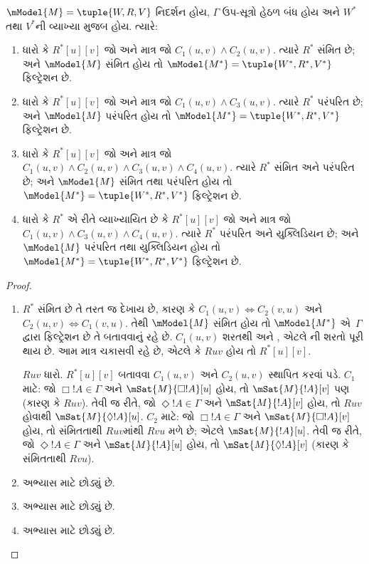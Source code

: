 \begin{thm}
  $\mModel{M} =\tuple{W,R,V}$ નિદર્શન હોય, $\Gamma$ ઉપ-સૂત્રો
  હેઠળ બંધ હોય અને $W^*$ તથા $V^*$ની વ્યાખ્યા
   મુજબ હોય. ત્યારે:
  \begin{enumerate}
  \item ધારો કે $R^*[u][v]$ જો અને માત્ર જો $C_1(u, v) \land
    C_2(u,v)$. ત્યારે $R^*$ સંમિત છે; અને $\mModel{M}$ સંમિત હોય
    તો $\mModel{M^*} = \tuple{W^*,R^*,V^*}$ ફિલ્ટ્રેશન છે.
  \item ધારો કે $R^*[u][v]$ જો અને માત્ર જો $C_1(u, v)
    \land C_3(u,v)$. ત્યારે $R^*$ પરંપરિત છે; અને
    $\mModel{M}$ પરંપરિત હોય તો
    $\mModel{M^*}=\tuple{W^*,R^*,V^*}$ ફિલ્ટ્રેશન છે.
  \item ધારો કે $R^*[u][v]$ જો અને માત્ર જો $C_1(u, v) \land C_2(u,v)
    \land C_3(u,v) \land C_4(u,v)$. ત્યારે $R^*$ સંમિત અને
    પરંપરિત છે; અને $\mModel{M}$ સંમિત તથા પરંપરિત હોય તો
    $\mModel{M^*}=\tuple{W^*,R^*,V^*}$ ફિલ્ટ્રેશન છે.
  \item ધારો કે $R^*$ એ રીતે વ્યાખ્યાયિત છે કે $R^*[u][v]$ જો
    અને માત્ર જો $C_1(u,
    v) \land C_3(u,v) \land C_4(u,v)$. ત્યારે $R^*$ પરંપરિત
    અને યુક્લિડિયન છે; અને $\mModel{M}$ પરંપરિત તથા યુક્લિડિયન
    હોય તો $\mModel{M^*}=\tuple{W^*,R^*,V^*}$ ફિલ્ટ્રેશન છે.
  \end{enumerate}
\end{thm}

\begin{proof}
  \begin{enumerate}
    \item $R^*$ સંમિત છે તે તરત જ દેખાય છે, કારણ કે $C_1(u,v)
      \Leftrightarrow C_2(v,u)$ અને $C_2(u,v) \Leftrightarrow
      C_1(v,u)$. તેથી $\mModel{M}$ સંમિત હોય તો
      $\mModel{M^*}$ એ~$\Gamma$ દ્વારા ફિલ્ટ્રેશન છે તે
      બતાવવાનું રહે છે. $C_1(u,v)$ શરતથી
           અને
          , એટલે
          ની શરતો
      પૂરી થાય છે. આમ માત્ર
       ચકાસવી રહે છે, એટલે કે
      $Ruv$ હોય તો $R^*[u][v]$.

      $Ruv$ ધારો. $R^*[u][v]$ બતાવવા $C_1(u,v)$ અને
      $C_2(u,v)$ સ્થાપિત કરવાં પડે. $C_1$ માટે:
      જો $\Box!A
        \in\Gamma$ અને $\mSat{M}{\Box!A}[u]$ હોય, તો
        $\mSat{M}{!A}[v]$ પણ (કારણ કે $Ruv$).
        તેવી જ રીતે, %
      જો $\Diamond!A \in \Gamma$ અને
        $\mSat{M}{!A}[v]$ હોય, તો $Ruv$ હોવાથી
        $\mSat{M}{\Diamond!A}[u]$.
      $C_2$ માટે:
      જો $\Box!A \in \Gamma$ અને
        $\mSat{M}{\Box!A}[v]$ હોય, તો સંમિતતાથી $Ruv$માંથી
        $Rvu$ મળે છે; એટલે $\mSat{M}{!A}[u]$.
        તેવી જ રીતે, %
      જો $\Diamond!A \in\Gamma$ અને
        $\mSat{M}{!A}[u]$ હોય, તો $\mSat{M}{\Diamond!A}[v]$
        (કારણ કે સંમિતતાથી $Rvu$).
    \item અભ્યાસ માટે છોડ્યું છે.
    \item અભ્યાસ માટે છોડ્યું છે.
    \item અભ્યાસ માટે છોડ્યું છે.
  \end{enumerate}
\end{proof}

